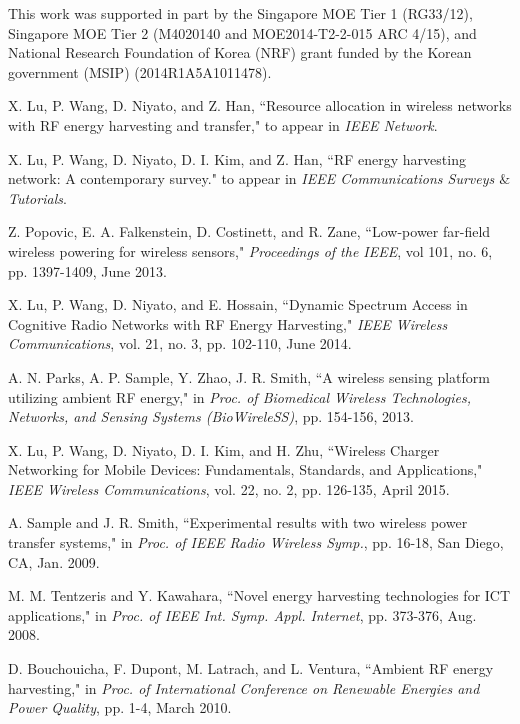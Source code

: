 \documentclass[12pt,draftclsnofoot,onecolumn]{IEEEtran}
\begin{document}
This work was supported in part by the Singapore MOE Tier 1  (RG33/12), Singapore MOE Tier 2 (M4020140 and MOE2014-T2-2-015 ARC 4/15), and National Research Foundation of Korea (NRF) grant funded by the Korean government (MSIP) (2014R1A5A1011478).   

 
\begin{thebibliography}{99}





X. Lu, P. Wang, D. Niyato, and Z. Han, ``Resource allocation in wireless networks with RF energy harvesting and transfer," to appear in \emph{IEEE Network}.

X. Lu, P. Wang, D. Niyato, D. I. Kim, and Z. Han, ``RF energy harvesting network: A contemporary survey." to appear in \emph{IEEE Communications Surveys $\&$ Tutorials}. 
 

Z. Popovic, E. A. Falkenstein, D. Costinett, and R. Zane, ``Low-power far-field wireless powering for wireless sensors," \emph{Proceedings of the IEEE}, vol 101, no. 6, pp. 1397-1409, June 2013.


X. Lu, P. Wang, D. Niyato, and E. Hossain, ``Dynamic Spectrum Access in Cognitive Radio Networks with RF Energy Harvesting," \emph{IEEE Wireless Communications}, vol. 21, no. 3, pp. 102-110, June 2014.



A. N. Parks, A. P. Sample, Y. Zhao, J. R. Smith, ``A wireless sensing platform utilizing ambient RF energy," in \emph{Proc. of Biomedical Wireless Technologies, Networks, and Sensing Systems (BioWireleSS)}, pp. 154-156, 2013.  

X. Lu, P. Wang, D. Niyato, D. I. Kim, and H. Zhu, ``Wireless Charger Networking for Mobile Devices: Fundamentals, Standards, and Applications,"  \emph{IEEE Wireless Communications}, vol. 22, no. 2, pp. 126-135, April 2015. 


A. Sample and J. R. Smith, ``Experimental results with two wireless power transfer systems," in \emph{Proc. of IEEE Radio Wireless Symp.}, pp. 16-18, San Diego, CA, Jan. 2009. 

M. M. Tentzeris and Y. Kawahara, ``Novel energy harvesting technologies for ICT applications," in \emph{Proc. of IEEE Int. Symp. Appl. Internet}, pp. 373-376, Aug. 2008.


D. Bouchouicha, F. Dupont, M. Latrach, and L. Ventura, ``Ambient RF energy harvesting," in \emph{Proc. of International Conference on Renewable Energies and Power Quality}, pp. 1-4, March 2010.


\end{thebibliography}
\end{document}
